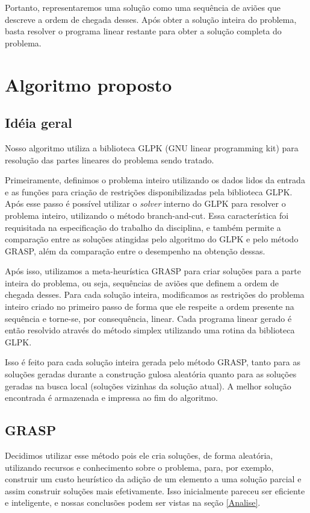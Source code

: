 \documentclass[a4paper,10pt]{abnt} %
\begin{document}
Portanto, representaremos uma solução como uma sequência de aviões que descreve a ordem de chegada desses. Após obter a solução inteira do problema, basta resolver o programa linear restante para obter a solução completa do problema.

\chapter{Algoritmo proposto}

\section{Idéia geral}

Nosso algoritmo utiliza a biblioteca GLPK (GNU linear programming kit) para resolução das partes lineares do problema sendo tratado.

Primeiramente, definimos o problema inteiro utilizando os dados lidos da entrada e as funções para criação de restrições disponibilizadas pela biblioteca GLPK. Após esse passo é possível utilizar o \emph{solver} interno do GLPK para resolver o problema inteiro, utilizando o método branch-and-cut. Essa característica foi requisitada na especificação do trabalho da disciplina, e também permite a comparação entre as soluções atingidas pelo algoritmo do GLPK e pelo método GRASP, além da comparação entre o desempenho na obtenção dessas.

Após isso, utilizamos a meta-heurística GRASP para criar soluções para a parte inteira do problema, ou seja, sequências de aviões que definem a ordem de chegada desses. Para cada solução inteira, modificamos as restrições do problema inteiro criado no primeiro passo de forma que ele respeite a ordem presente na sequência e torne-se, por consequência, linear. Cada programa linear gerado é então resolvido através do método simplex utilizando uma rotina da biblioteca GLPK.

Isso é feito para cada solução inteira gerada pelo método GRASP, tanto para as soluções geradas durante a construção gulosa aleatória quanto para as soluções geradas na busca local (soluções vizinhas da solução atual). A melhor solução encontrada é armazenada e impressa ao fim do algoritmo.

\section{GRASP}

Decidimos utilizar esse método pois ele cria soluções, de forma aleatória, utilizando recursos e conhecimento sobre o problema, para, por exemplo, construir um custo heurístico da adição de um elemento a uma solução parcial e assim construir soluções mais efetivamente. Isso inicialmente pareceu ser eficiente e inteligente, e nossas conclusões podem ser vistas na seção \ref{Analise}.
\end{document}
